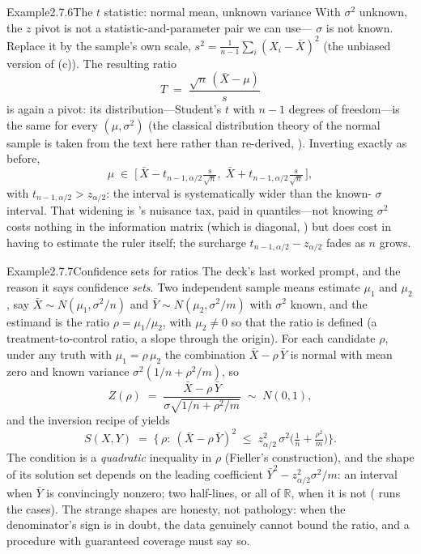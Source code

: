 \documentclass[main.tex]{subfiles}
\begin{document}
\begin{ObjL}{Example}{2.7.6}{The $t$ statistic: normal mean, unknown variance}
With $\sigma^2$ unknown, the $z$ pivot is not a statistic-and-parameter pair we can use---%
$\sigma$ is not known. Replace it by the sample's own scale,
$s^2=\frac{1}{n-1}\sum_i(X_i-\bar X)^2$ (the unbiased version of (c)). The
resulting ratio
\[ T \;=\; \frac{\sqrt n\,(\bar X-\mu)}{s} \]
is again a pivot: its distribution---Student's $t$ with $n-1$ degrees of freedom---is the
same for every $(\mu,\sigma^2)$ (the classical distribution theory of the normal sample is
taken from the text here rather than re-derived, ). Inverting exactly as before,
\[ \mu \;\in\; \Big[\, \bar X - t_{n-1,\alpha/2}\tfrac{s}{\sqrt n},\;
   \bar X + t_{n-1,\alpha/2}\tfrac{s}{\sqrt n} \,\Big] , \]
with $t_{n-1,\alpha/2}>z_{\alpha/2}$: the interval is systematically wider than the known-%
$\sigma$ interval. That widening is 's nuisance tax, paid in quantiles---not
knowing $\sigma^2$ costs nothing in the information matrix (which is diagonal,
) but does cost in having to estimate the ruler itself; the surcharge
$t_{n-1,\alpha/2}-z_{\alpha/2}$ fades as $n$ grows.
\end{ObjL}

\begin{ObjL}{Example}{2.7.7}{Confidence sets for ratios}
The deck's last worked prompt, and the reason it says confidence \emph{sets}. Two
independent sample means estimate $\mu_1$ and $\mu_2$, say $\bar X\sim N(\mu_1,\sigma^2/n)$
and $\bar Y\sim N(\mu_2,\sigma^2/m)$ with $\sigma^2$ known, and the estimand is the ratio
$\rho=\mu_1/\mu_2$, with $\mu_2\ne0$ so that the ratio is defined (a treatment-to-control
ratio, a slope through the origin). For each
candidate $\rho$, under any truth with $\mu_1=\rho\,\mu_2$ the combination
$\bar X-\rho\,\bar Y$ is normal with mean zero and known variance
$\sigma^2(1/n+\rho^2/m)$, so
\[ Z(\rho) \;=\; \frac{\bar X-\rho\,\bar Y}{\sigma\sqrt{1/n+\rho^2/m}} \;\sim\; N(0,1) , \]
and the inversion recipe of  yields
\[ S(X,Y) \;=\; \Big\{\, \rho :\ (\bar X-\rho\,\bar Y)^2 \;\le\;
   z_{\alpha/2}^2\,\sigma^2\big(\tfrac1n+\tfrac{\rho^2}{m}\big) \Big\} . \]
The condition is a \emph{quadratic} inequality in $\rho$ (Fieller's construction), and the
shape of its solution set depends on the leading coefficient
$\bar Y^2-z_{\alpha/2}^2\sigma^2/m$: an interval when $\bar Y$ is convincingly nonzero; two
half-lines, or all of $\mathbb{R}$, when it is not ( runs the cases). The
strange shapes are honesty, not pathology: when the denominator's sign is in doubt, the data
genuinely cannot bound the ratio, and a procedure with guaranteed coverage must say
so.
\end{ObjL}
\end{document}
